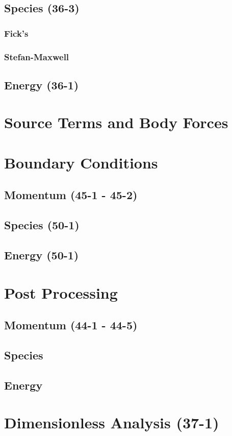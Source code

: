 \documentclass{report}
\begin{document}
\subsection{Species (36-3)}
\subsubsection{Fick's}
\subsubsection{Stefan-Maxwell}
\subsection{Energy (36-1)}
%
\section{Source Terms and Body Forces}
\section{Boundary Conditions}
\subsection{Momentum (45-1 - 45-2)}
\subsection{Species (50-1)}
\subsection{Energy (50-1)}
\section{Post Processing}
\subsection{Momentum (44-1 - 44-5)}
\subsection{Species}
\subsection{Energy}
\section{Dimensionless Analysis (37-1)}
\end{document}
